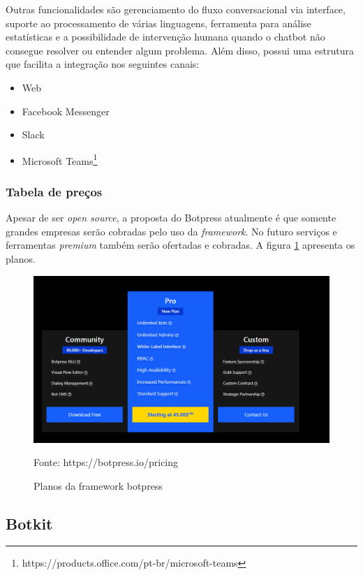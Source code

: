 Outras funcionalidades são gerenciamento do fluxo conversacional via interface, suporte ao processamento de várias linguagens, ferramenta para análise estatísticas e a possibilidade de intervenção humana quando o chatbot não consegue resolver ou entender algum problema. Além disso, possui uma estrutura que facilita a integração nos seguintes canais:

\begin{itemize}
    \item Web
    \item Facebook Messenger
    \item Slack
    \item Microsoft Teams\footnote{https://products.office.com/pt-br/microsoft-teams}
\end{itemize}

\subsubsection{Tabela de preços}

Apesar de ser \textit{open source}, a proposta do Botpress atualmente é que somente grandes empresas serão cobradas pelo uso da \textit{framework}. No futuro serviços e ferramentas \textit{premium} também serão ofertadas e cobradas. A figura \ref{fig:bot-planos} apresenta os planos.

\begin{figure}[H]
  \caption{Planos da framework botpress}

  \centering
  \includegraphics[scale=0.5]{Imagens/botpress-precos.png} 
 
  \label{fig:bot-planos}
  Fonte: https://botpress.io/pricing
\end{figure}



\subsection{Botkit}

